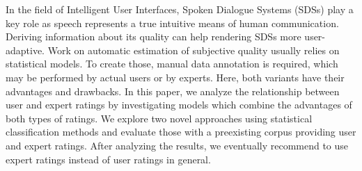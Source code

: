 In the field of Intelligent User Interfaces, Spoken Dialogue Systems (SDSs) play a key role as speech represents a true intuitive means of human
 communication. Deriving information about its quality can help rendering SDSs
 more user-adaptive. Work on automatic estimation of subjective quality usually
 relies on statistical models. To create those, manual data annotation is
 required, which may be performed by actual users or by experts. Here, both
 variants have their advantages and drawbacks. In this paper, we analyze the
 relationship between user and expert ratings by investigating models which
 combine the advantages of both types of ratings. We explore two novel
 approaches using statistical classification methods and evaluate those with a
 preexisting corpus providing user and expert ratings. After analyzing the
 results, we eventually recommend to use expert ratings instead of user ratings
 in general.

